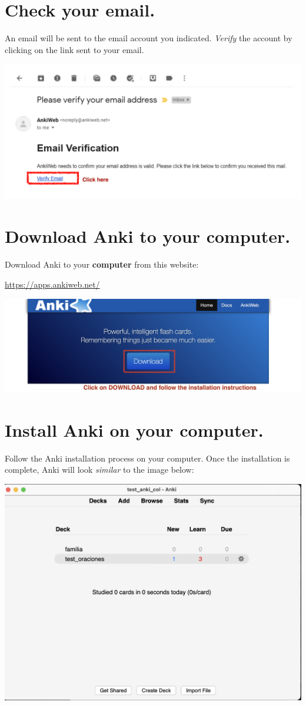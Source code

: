\documentclass[
]{book}
\begin{document}
\hypertarget{check-your-email.}{%
\section{Check your email.}\label{check-your-email.}}

An email will be sent to the email account you indicated. \emph{Verify} the account by clicking on the link sent to your email.

\includegraphics[width=0.9\linewidth]{images/reposit_en/email_verification}

\hypertarget{download-anki-to-your-computer.}{%
\section{Download Anki to your computer.}\label{download-anki-to-your-computer.}}

Download Anki to your \textbf{computer} from this website:

\url{https://apps.ankiweb.net/}

\includegraphics[width=0.6\linewidth]{images/reposit_en/download}

\hypertarget{install-anki-on-your-computer.}{%
\section{Install Anki on your computer.}\label{install-anki-on-your-computer.}}

Follow the Anki installation process on your computer. Once the installation is complete, Anki will look \emph{similar} to the image below:

\includegraphics[width=0.6\linewidth]{images/reposit_en/anki_screen}
\end{document}
